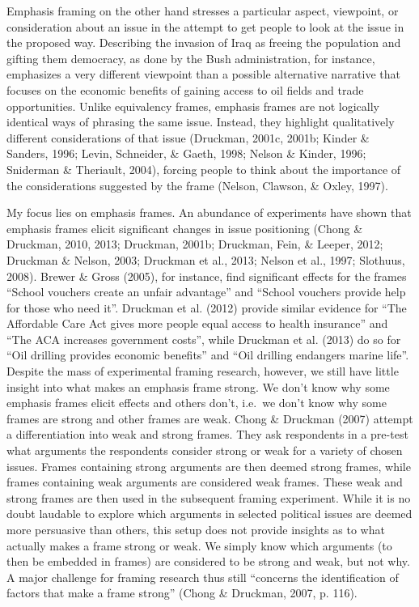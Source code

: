 \documentclass[12pt,econ]{sources/authesis}
\begin{document}
Emphasis framing on the other hand stresses a particular aspect, viewpoint, or consideration about an issue in the attempt to get people to look at the issue in the proposed way. Describing the invasion of Iraq as freeing the population and gifting them democracy, as done by the Bush administration, for instance, emphasizes a very different viewpoint than a possible alternative narrative that focuses on the economic benefits of gaining access to oil fields and trade opportunities. Unlike equivalency frames, emphasis frames are not logically identical ways of phrasing the same issue. Instead, they highlight qualitatively different considerations of that issue (Druckman, 2001c, 2001b; Kinder \& Sanders, 1996; Levin, Schneider, \& Gaeth, 1998; Nelson \& Kinder, 1996; Sniderman \& Theriault, 2004), forcing people to think about the importance of the considerations suggested by the frame (Nelson, Clawson, \& Oxley, 1997).

My focus lies on emphasis frames. An abundance of experiments have shown that emphasis frames elicit significant changes in issue positioning (Chong \& Druckman, 2010, 2013; Druckman, 2001b; Druckman, Fein, \& Leeper, 2012; Druckman \& Nelson, 2003; Druckman et al., 2013; Nelson et al., 1997; Slothuus, 2008). Brewer \& Gross (2005), for instance, find significant effects for the frames ``School vouchers create an unfair advantage'' and ``School vouchers provide help for those who need it''. Druckman et al. (2012) provide similar evidence for ``The Affordable Care Act gives more people equal access to health insurance'' and ``The ACA increases government costs'', while Druckman et al. (2013) do so for ``Oil drilling provides economic benefits'' and ``Oil drilling endangers marine life''. Despite the mass of experimental framing research, however, we still have little insight into what makes an emphasis frame strong. We don't know why some emphasis frames elicit effects and others don't, i.e.~we don't know why some frames are strong and other frames are weak. Chong \& Druckman (2007) attempt a differentiation into weak and strong frames. They ask respondents in a pre-test what arguments the respondents consider strong or weak for a variety of chosen issues. Frames containing strong arguments are then deemed strong frames, while frames containing weak arguments are considered weak frames. These weak and strong frames are then used in the subsequent framing experiment. While it is no doubt laudable to explore which arguments in selected political issues are deemed more persuasive than others, this setup does not provide insights as to what actually makes a frame strong or weak. We simply know which arguments (to then be embedded in frames) are considered to be strong and weak, but not why. A major challenge for framing research thus still ``concerns the identification of factors that make a frame strong'' (Chong \& Druckman, 2007, p. 116).
\end{document}
